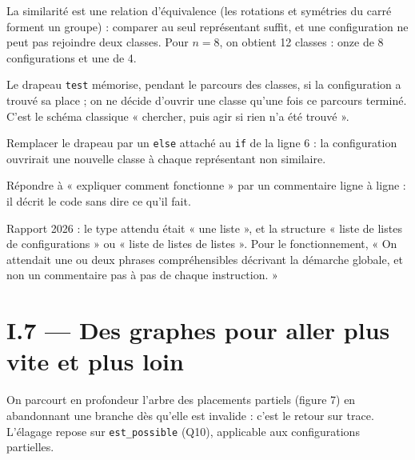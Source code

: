 \documentclass[11pt,a4paper]{article}
\begin{document}
La similarité est une relation d'équivalence (les rotations et symétries du carré forment un groupe) : comparer au seul représentant suffit, et une configuration ne peut pas rejoindre deux classes. Pour \(n = 8\), on obtient 12 classes : onze de 8 configurations et une de 4.

\begin{methode}

Le drapeau \texttt{test} mémorise, pendant le parcours des classes, si la configuration a trouvé sa place ; on ne décide d'ouvrir une classe qu'une fois ce parcours terminé. C'est le schéma classique « chercher, puis agir si rien n'a été trouvé ».

\end{methode}

\begin{piege}

Remplacer le drapeau par un \texttt{else} attaché au \texttt{if} de la ligne 6 : la configuration ouvrirait une nouvelle classe à chaque représentant non similaire.

\end{piege}

\begin{piege}

Répondre à « expliquer comment fonctionne » par un commentaire ligne à ligne : il décrit le code sans dire ce qu'il fait.

\end{piege}

\begin{jury}

Rapport 2026 : le type attendu était « une liste », et la structure « liste de listes de configurations » ou « liste de listes de listes ». Pour le fonctionnement, « On attendait une ou deux phrases compréhensibles décrivant la démarche globale, et non un commentaire pas à pas de chaque instruction. »

\end{jury}

\hypertarget{i.7-des-graphes-pour-aller-plus-vite-et-plus-loin}{%
\section{I.7 --- Des graphes pour aller plus vite et plus loin}\label{i.7-des-graphes-pour-aller-plus-vite-et-plus-loin}}

On parcourt en profondeur l'arbre des placements partiels (figure 7) en abandonnant une branche dès qu'elle est invalide : c'est le retour sur trace. L'élagage repose sur \texttt{est\_possible} (Q10), applicable aux configurations partielles.
\end{document}
